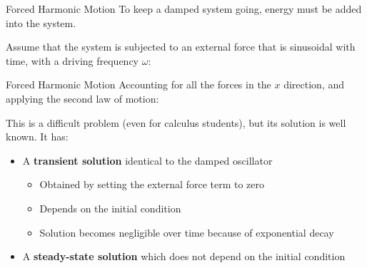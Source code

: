 \documentclass[12pt,compress,aspectratio=169]{beamer}
\begin{document}
\begin{frame}{Forced Harmonic Motion}
  \vspace{.2in}
  To keep a damped system going, energy must be added into the system.
  \begin{center}
  \end{center}
  Assume that the system is subjected to an external force that is sinusoidal
  with time, with a driving frequency $\omega$:

\end{frame}



\begin{frame}{Forced Harmonic Motion}
  Accounting for all the forces in the $x$ direction, and applying the second
  law of motion:
  

  This is a difficult problem (even for calculus students), but its solution is
  well known. It has:
  \begin{itemize}
  \item A \textbf{transient solution} identical to the damped oscillator
    \begin{itemize}
    \item Obtained by setting the external force term to zero
    \item Depends on the initial condition
    \item Solution becomes negligible over time because of exponential decay
    \end{itemize}
  \item A \textbf{steady-state solution} which does not depend on the initial
    condition
  \end{itemize}
\end{frame}
\end{document}
